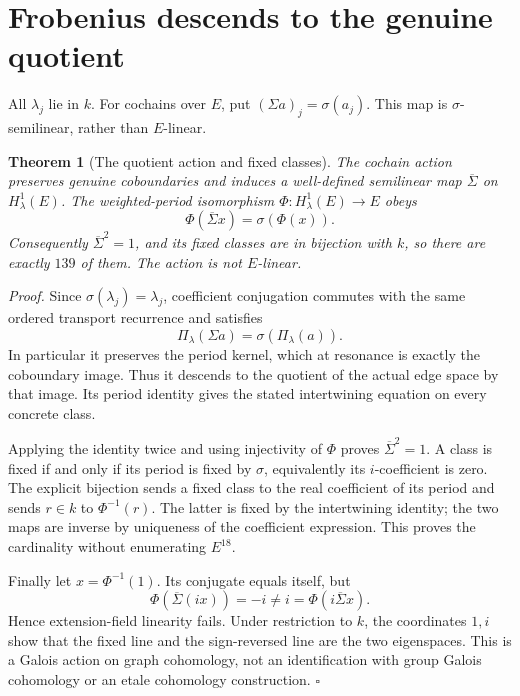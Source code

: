 \documentclass[11pt,letterpaper]{article}
\newtheorem{theorem}{Theorem}
\newenvironment{proof}{\noindent\textit{Proof.}}{\hfill\(\square\)}
\begin{document}
\section{Frobenius descends to the genuine quotient}

All \(\lambda_j\) lie in \(k\). For cochains over \(E\), put \((\Sigma a)_j=\sigma(a_j)\). This map is \(\sigma\)-semilinear, rather than \(E\)-linear.

\begin{theorem}[The quotient action and fixed classes]
The cochain action preserves genuine coboundaries and induces a well-defined semilinear map \(\overline\Sigma\) on \(H^1_\lambda(E)\). The weighted-period isomorphism \(\Phi:H^1_\lambda(E)\to E\) obeys
\[
\Phi(\overline\Sigma x)=\sigma(\Phi(x)).
\]
Consequently \(\overline\Sigma^2=1\), and its fixed classes are in bijection with \(k\), so there are exactly \(139\) of them. The action is not \(E\)-linear.
\end{theorem}
\begin{proof}
Since \(\sigma(\lambda_j)=\lambda_j\), coefficient conjugation commutes with the same ordered transport recurrence and satisfies
\[
\Pi_\lambda(\Sigma a)=\sigma(\Pi_\lambda(a)).
\]
In particular it preserves the period kernel, which at resonance is exactly the coboundary image. Thus it descends to the quotient of the actual edge space by that image. Its period identity gives the stated intertwining equation on every concrete class.

Applying the identity twice and using injectivity of \(\Phi\) proves \(\overline\Sigma^2=1\). A class is fixed if and only if its period is fixed by \(\sigma\), equivalently its \(i\)-coefficient is zero. The explicit bijection sends a fixed class to the real coefficient of its period and sends \(r\in k\) to \(\Phi^{-1}(r)\). The latter is fixed by the intertwining identity; the two maps are inverse by uniqueness of the coefficient expression. This proves the cardinality without enumerating \(E^{18}\).

Finally let \(x=\Phi^{-1}(1)\). Its conjugate equals itself, but
\[
\Phi(\overline\Sigma(i x))=-i\ne i=\Phi(i\overline\Sigma x).
\]
Hence extension-field linearity fails. Under restriction to \(k\), the coordinates \(1,i\) show that the fixed line and the sign-reversed line are the two eigenspaces. This is a Galois action on graph cohomology, not an identification with group Galois cohomology or an etale cohomology construction.
\end{proof}
\end{document}
